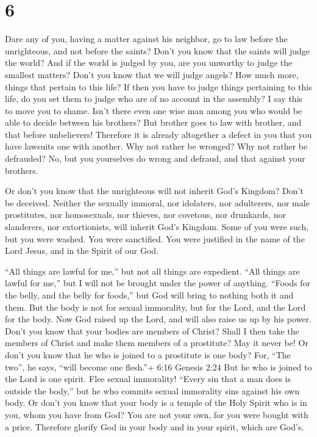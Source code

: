 \hypertarget{section-5}{%
\section{6}\label{section-5}}

 Dare any of you, having a matter against his neighbor, go
to law before the unrighteous, and not before the saints? 
Don't you know that the saints will judge the world? And if the world is
judged by you, are you unworthy to judge the smallest matters?
 Don't you know that we will judge angels? How much more,
things that pertain to this life?  If then you have to judge
things pertaining to this life, do you set them to judge who are of no
account in the assembly?  I say this to move you to shame.
Isn't there even one wise man among you who would be able to decide
between his brothers?  But brother goes to law with brother,
and that before unbelievers!  Therefore it is already
altogether a defect in you that you have lawsuits one with another. Why
not rather be wronged? Why not rather be defrauded?  No, but
you yourselves do wrong and defraud, and that against your brothers.

 Or don't you know that the unrighteous will not inherit
God's Kingdom? Don't be deceived. Neither the sexually immoral, nor
idolaters, nor adulterers, nor male prostitutes, nor homosexuals,
 nor thieves, nor covetous, nor drunkards, nor slanderers,
nor extortionists, will inherit God's Kingdom.  Some of you
were such, but you were washed. You were sanctified. You were justified
in the name of the Lord Jesus, and in the Spirit of our God.

 ``All things are lawful for me,'' but not all things are
expedient. ``All things are lawful for me,'' but I will not be brought
under the power of anything.  ``Foods for the belly, and
the belly for foods,'' but God will bring to nothing both it and them.
But the body is not for sexual immorality, but for the Lord, and the
Lord for the body.  Now God raised up the Lord, and will
also raise us up by his power.  Don't you know that your
bodies are members of Christ? Shall I then take the members of Christ
and make them members of a prostitute? May it never be!  Or
don't you know that he who is joined to a prostitute is one body? For,
``The two'', he says, ``will become one flesh.''+ 6:16 Genesis 2:24
 But he who is joined to the Lord is one spirit.
 Flee sexual immorality! ``Every sin that a man does is
outside the body,'' but he who commits sexual immorality sins against
his own body.  Or don't you know that your body is a temple
of the Holy Spirit who is in you, whom you have from God? You are not
your own,  for you were bought with a price. Therefore
glorify God in your body and in your spirit, which are God's.

